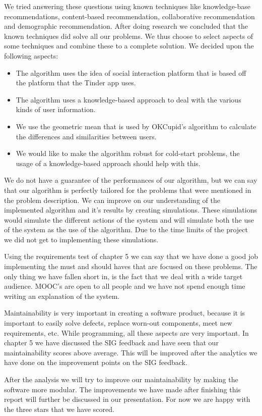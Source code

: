 We tried answering these questions using known techniques like knowledge-base recommendations, content-based recommendation, collaborative recommendation and demographic recommendation.
After doing research we concluded that the known techniques did solve all our problems.
We thus choose to select aspects of some techniques and combine these to a complete solution.
We decided upon the following aspects:
\begin{itemize}
\item The algorithm uses the idea of social interaction platform that is based off the platform that the Tinder app uses.
\item The algorithm uses a knowledge-based approach to deal with the various kinds of user information.
\item We use the geometric mean that is used by OKCupid's algorithm to calculate the differences and similarities between users.
\item We would like to make the algorithm robust for cold-start problems, the usage of a knowledge-based approach should help with this.
\end{itemize}

We do not have a guarantee of the performances of our algorithm, but we can say that our algorithm is perfectly tailored for the problems that were mentioned in the problem description.
We can improve on our understanding of the implemented algorithm and it's results by creating simulations.
These simulations would simulate the different actions of the system and will simulate both the use of the system as the use of the algorithm.
Due to the time limits of the project we did not get to implementing these simulations.

Using the requirements test of chapter 5 we can say that we have done a good job implementing the must and should haves that are focused on these problems.
The only thing we have fallen short in, is the fact that we deal with a wide target audience.
MOOC's are open to all people and we have not spend enough time writing an explanation of the system.

Maintainability is very important in creating a software product, because it is important to easily solve defects, replace worn-out components, meet new requirements, etc.
While programming, all these aspects are very important.
In chapter 5 we have discussed the SIG feedback and have seen that our maintainability scores above average.
This will be improved after the analytics we have done on the improvement points on the SIG feedback.

After the analysis we will try to improve our maintainability by making the software more modular. 
The improvements we have made after finishing this report will further be discussed in our presentation.
For now we are happy with the three stars that we have scored.
